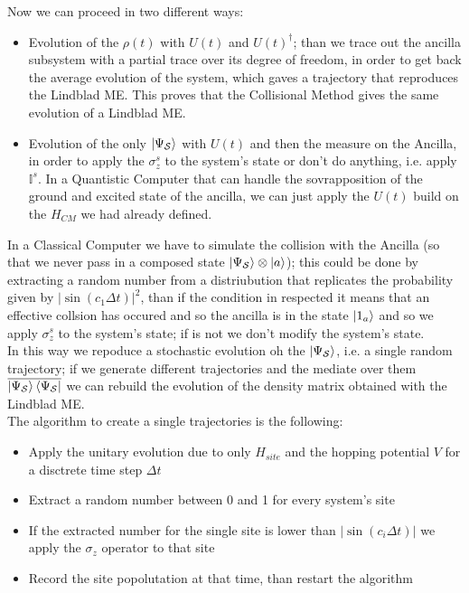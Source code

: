 \documentclass[a4paper,12pt]{article}
\begin{document}
	Now we can proceed in two different ways:
	\begin{itemize}
		\item Evolution of the $ \rho (t) $ with $ U(t) $ and $ U(t)^{\dagger} $; than we trace out the ancilla subsystem with a partial trace over its degree of freedom, in order to get back the average evolution of the system, which gaves a trajectory that reproduces the Lindblad ME. This proves that the Collisional Method gives the same evolution of a Lindblad ME.
		\item Evolution of the only $ \ket{\Psi_{\mathcal{S}}} $ with $ U(t) $ and then the measure on the Ancilla, in order to apply the $ \sigma_z^s $ to the system's state or don't do anything, i.e. apply $ \mathbb{I}^s $. In a Quantistic Computer that can handle the sovrapposition of the ground and excited state of the ancilla, we can just apply the $  U(t) $ build on the $ H_{CM} $ we had already defined.
	\end{itemize}
	
	In a Classical Computer we have to simulate the collision with the Ancilla (so that we never pass in a composed state $ \ket{\Psi_{\mathcal{S}}} \otimes \ket{a} $); this could be done by extracting a random number from a distriubution that replicates the probability given by $ \left| \sin{(c_1 \Delta t)} \right|^2 $, than if the condition in respected it means that an effective collsion has occured and so the ancilla is in the state $ \ket{1_a} $ and so we apply $ \sigma_z^s $ to the system's state; if is not we don't modify the system's state. \\
	In this way we repoduce a stochastic evolution oh the $ \ket{\Psi_{\mathcal{S}}} $, i.e. a single random trajectory; if we generate different trajectories and the mediate over them $ \overline{\ket{\Psi_{\mathcal{S}}} \bra{\Psi_{\mathcal{S}}}} $ we can rebuild the evolution of the density matrix obtained with the Lindblad ME. \\
	The algorithm to create a single trajectories is the following:
	\begin{itemize}
		\item [1.] Apply the unitary evolution due to only $ H_{site} $ and the hopping potential $ V $ for a disctrete time step $ \Delta t $
		\item[2.] Extract a random number between 0 and 1 for every system's site 
		\item[3.] If the extracted number for the single site is lower than $ \left| \sin{(c_i \Delta t)} \right| $ we apply the $ \sigma_z $ operator to that site 
		\item[4.] Record the site popolutation at that time, than restart the algorithm
	\end{itemize}
	
\end{document}
